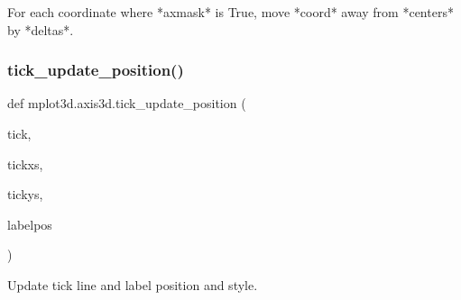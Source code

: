 \begin{DoxyVerb}For each coordinate where *axmask* is True, move *coord* away from
*centers* by *deltas*.
\end{DoxyVerb}
 \mbox{\label{namespacemplot3d_1_1axis3d_a868d18d0c0072c9d132db752e282e581}} 
\subsubsection{\texorpdfstring{tick\+\_\+update\+\_\+position()}{tick\_update\_position()}}
{\footnotesize\ttfamily def mplot3d.\+axis3d.\+tick\+\_\+update\+\_\+position (\begin{DoxyParamCaption}\item[{}]{tick,  }\item[{}]{tickxs,  }\item[{}]{tickys,  }\item[{}]{labelpos }\end{DoxyParamCaption})}

\begin{DoxyVerb}Update tick line and label position and style.\end{DoxyVerb}
 